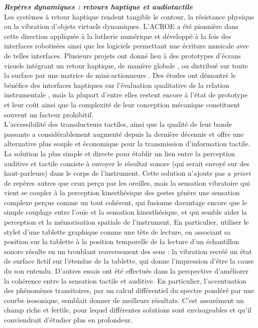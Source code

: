 \noindent\textbf{\textit{Repères dynamiques : retours haptique et audiotactile}}\\
\label{sec:audio-fretting}
\noindent Les systèmes à retour haptique rendent tangible le contour, la résistance physique ou la vibration d'objets virtuels dynamiques. L'\gls{ACROE} a été pionnière dans cette direction appliquée à la lutherie numérique et développé à la fois des interfaces robotisées ainsi que les logiciels permettant une écriture musicale avec de telles interfaces. Plusieurs projets ont donné lieu à des prototypes d'écrans visuels intégrant un retour haptique, de manière globale \cite{sinclair_touchmover_2013}, ou distribué sur toute la surface par une matrice de mini-actionneurs \cite{follmer_inform_2013}. Des études ont démontré le bénéfice des interfaces haptiques sur l'évaluation qualitative de la relation instrumentale \cite{omodhrain_playing_2001, young_qualitative_2017}, mais la plupart d'entre elles restent encore à l'état de prototype et leur coût ainsi que la complexité de leur conception mécanique constituent souvent un facteur prohibitif.\\
\indent L'accessibilité des transducteurs tactiles, ainsi que la qualité de leur bande passante a considérablement augmenté depuis la dernière décennie et offre une alternative plus souple et économique pour la transmission d'information tactile. La solution la plus simple et directe pour établir un lien entre la perception auditive et tactile consiste à envoyer le résultat sonore (qui serait envoyé sur des haut-parleurs) dans le corps de l'instrument. Cette solution n'ajoute pas \textit{a priori} de repères autres que ceux perçu par les oreilles, mais la sensation vibratoire qui vient se coupler à la perception kinesthésique des gestes génère une sensation complexe perçue comme un tout cohérent, qui fusionne davantage encore que le simple couplage entre l'ouïe et la sensation kinesthésique, et qui semble aider la perception et la mémorisation spatiale de l'instrument. En particulier, utiliser le stylet d'une tablette graphique comme une tête de lecture, en associant sa position sur la tablette à la position temporelle de la lecture d'un échantillon sonore résulte en un troublant renversement des sens : la vibration recréé un état de surface fictif sur l'étendue de la tablette, qui donne l'impression d'être la cause du son entendu. D'autres essais ont été effectués dans la perspective d'améliorer la cohérence entre la sensation tactile et auditive. En particulier, l'accentuation des phénomènes transitoires, par un calcul différentiel du spectre pondéré par une courbe isosonique, semblait donner de meilleurs résultats. C'est assurément un champ riche et fertile, pour lequel différentes solutions sont envisageables et qu'il conviendrait d'étudier plus en profondeur.\\
